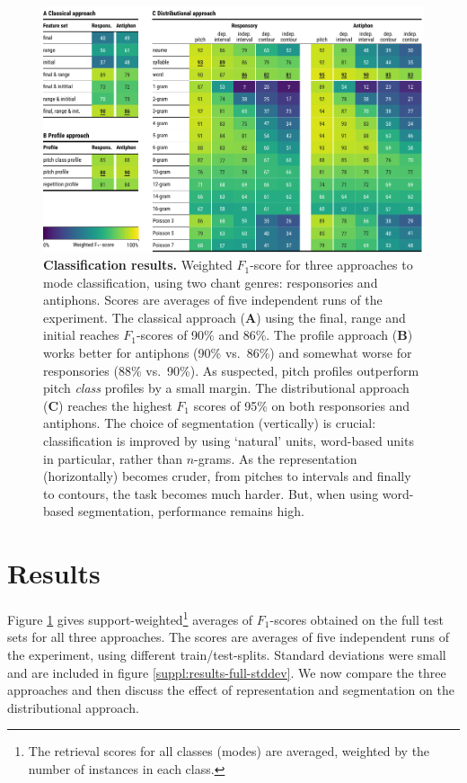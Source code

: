 \documentclass{article}
\newcommand{\subfiglabel}[1]{(\textbf{\textsc{#1}})}
\begin{document}
\begin{figure}[t!]
    \includegraphics[width=\textwidth]{figs/fig05-classification-results.pdf}
    \caption{
        \textbf{Classification results.}
        Weighted $F_1$-score for three approaches to mode classification, using two chant genres: responsories and antiphons.
        Scores are averages of five independent runs of the experiment.
        The classical approach \subfiglabel{A} using the final, range and initial reaches $F_1$-scores of 90\% and 86\%.
        The profile approach \subfiglabel{B} works better for antiphons (90\% vs.~86\%) and somewhat worse for responsories (88\% vs.~90\%).
        As \cite{Wiering2006} suspected, pitch profiles outperform pitch \emph{class} profiles by a small margin.
        The distributional approach \subfiglabel{C} reaches the highest $F_1$ scores of 95\% on both responsories and antiphons.
        The choice of segmentation (vertically) is crucial: classification is improved by using `natural' units, word-based units in particular, rather than $n$-grams.
        As the representation (horizontally) becomes cruder, from pitches to intervals and finally to contours, the task becomes much harder.
        But, when using word-based segmentation, performance remains high. 
        \label{fig:scores}
    }
\end{figure}



\section{Results}


Figure \ref{fig:scores} gives support-weighted\footnote{%
    The retrieval scores for all classes (modes) are averaged, weighted by the number of instances in each class.
    }
averages of $F_1$-scores obtained on the full test sets for all three approaches.
The scores are averages of five independent runs of the experiment, using different train/test-splits.
Standard deviations were small and are included in figure \ref{suppl:results-full-stddev}.
We now compare the three approaches and then discuss the effect of representation and segmentation on the distributional approach.
\end{document}
